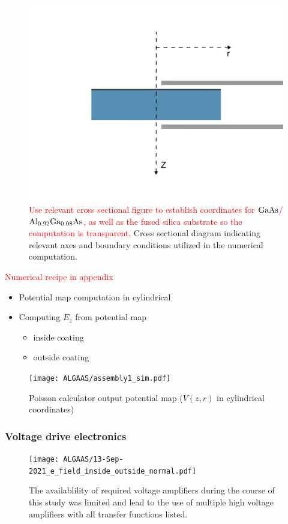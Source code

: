 \begin{figure}[H]
  \centering
  \includegraphics[width=.65\textwidth]{figs/ALGAAS/laplace_coord_test.pdf}
  \caption{\textcolor{red}{Use relevant cross sectional figure to establish coordinates for $\mathrm{GaAs}$/$\mathrm{Al_{0.92}Ga_{0.08}As}$, as well as the fused silica substrate so the computation is transparent.} Cross sectional diagram indicating relevant axes and boundary conditions utilized in the numerical computation.}
  \label{fig:laplace_coords}
\end{figure}

\noindent \textcolor{red}{Numerical recipe in appendix}

\begin{itemize}
\item Potential map computation in cylindrical
\item Computing $E_z$ from potential map
\begin{itemize}
\item inside coating
\item outside coating
\end{itemize}
\end{itemize}


\begin{figure}[H]
  \texttt{[image: ALGAAS/assembly1\_sim.pdf]}
  \caption{Poisson calculator output potential map ($V(z,r)$ in cylindrical coordinates)}
  \label{fig:poisson_calc_output}
\end{figure}

\subsubsection{Voltage drive electronics}

\begin{figure}[H]
    \texttt{[image: ALGAAS/13-Sep-2021\_e\_field\_inside\_outside\_normal.pdf]}
    \caption{The availablility of required voltage amplifiers during the course of this study was limited and lead to the use of multiple high voltage amplifiers with all transfer functions listed.}
\label{fig:Ez}
\end{figure}


